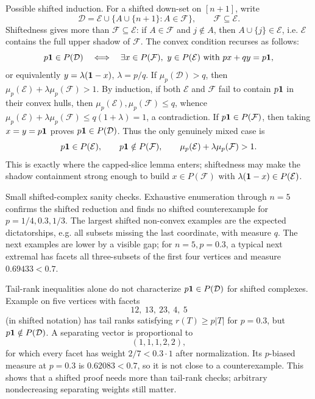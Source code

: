 \documentclass[12pt]{article}
\begin{document}
Possible shifted induction.  For a shifted down-set on \([n+1]\), write
\[
 \mathcal D=\mathcal E\cup\{A\cup\{n+1\}:A\in\mathcal F\},
 \qquad \mathcal F\subseteq\mathcal E.
\]
Shiftedness gives more than \(\mathcal F\subseteq\mathcal E\): if
\(A\in\mathcal F\) and \(j\notin A\), then \(A\cup\{j\}\in\mathcal E\), i.e.
\(\mathcal E\) contains the full upper shadow of \(\mathcal F\).  The convex
condition recurses as follows:
\[
 p{\bf1}\in P(\mathcal D)
 \quad\Longleftrightarrow\quad
 \exists x\in P(\mathcal F),\ y\in P(\mathcal E)
 \text{ with } p x+q y=p{\bf1},
\]
or equivalently \(y=\lambda({\bf1}-x)\), \(\lambda=p/q\).
If \(\mu_p(\mathcal D)>q\), then \(\mu_p(\mathcal E)+\lambda\mu_p(\mathcal F)>1\).
By induction, if both \(\mathcal E\) and \(\mathcal F\) fail to contain
\(p{\bf1}\) in their convex hulls, then
\(\mu_p(\mathcal E),\mu_p(\mathcal F)\le q\), whence
\(\mu_p(\mathcal E)+\lambda\mu_p(\mathcal F)\le q(1+\lambda)=1\), a
contradiction.  If \(p{\bf1}\in P(\mathcal F)\), then taking
\(x=y=p{\bf1}\) proves \(p{\bf1}\in P(\mathcal D)\).  Thus the only genuinely
mixed case is
\[
 p{\bf1}\in P(\mathcal E),\qquad p{\bf1}\notin P(\mathcal F),
 \qquad \mu_p(\mathcal E)+\lambda\mu_p(\mathcal F)>1.
\]
This is exactly where the capped-slice lemma enters; shiftedness may make the
shadow containment strong enough to build \(x\in P(\mathcal F)\) with
\(\lambda({\bf1}-x)\in P(\mathcal E)\).

Small shifted-complex sanity checks.  Exhaustive enumeration through \(n=5\)
confirms the shifted reduction and finds no shifted counterexample for
\(p=1/4,0.3,1/3\).  The largest shifted non-convex examples are the expected
dictatorships, e.g. all subsets missing the last coordinate, with measure
\(q\).  The next examples are lower by a visible gap; for \(n=5,p=0.3\), a
typical next extremal has facets all three-subsets of the first four vertices
and measure \(0.69433<0.7\).

Tail-rank inequalities alone do not characterize \(p{\bf1}\in P(\mathcal D)\)
for shifted complexes.  Example on five vertices with facets
\[
 12,\ 13,\ 23,\ 4,\ 5
\]
(in shifted notation) has tail ranks satisfying
\(r(T)\ge p|T|\) for \(p=0.3\), but \(p{\bf1}\notin P(\mathcal D)\).  A
separating vector is proportional to
\[
 (1,1,1,2,2),
\]
for which every facet has weight \(2/7<0.3\cdot 1\) after normalization.
Its \(p\)-biased measure at \(p=0.3\) is \(0.62083<0.7\), so it is not close to
a counterexample.  This shows that a shifted proof needs more than tail-rank
checks; arbitrary nondecreasing separating weights still matter.
\end{document}
